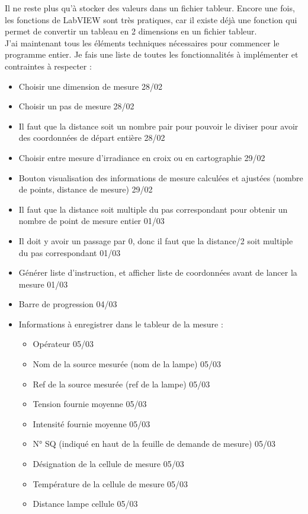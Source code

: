 \documentclass[12pt]{article}
\begin{document}
Il ne reste plus qu'à stocker des valeurs dans un fichier tableur.
Encore une fois, les fonctions de LabVIEW sont très pratiques, car il existe déjà une fonction qui permet de convertir un tableau en 2 dimensions en un fichier tableur.\\
J'ai maintenant tous les éléments techniques nécessaires pour commencer le programme entier.
Je fais une liste de toutes les fonctionnalités à implémenter et contraintes à respecter :
\begin{itemize}
	\item  Choisir une dimension de mesure  28/02
	\item  Choisir un pas de mesure  28/02
	\item  Il faut que la distance soit un nombre pair pour pouvoir le diviser pour avoir des coordonnées de départ entière  28/02
	\item  Choisir entre mesure d'irradiance en croix ou en cartographie 29/02
	\item  Bouton visualisation des informations de mesure calculées et ajustées (nombre de points, distance de mesure)  29/02
	\item  Il faut que la distance soit multiple du pas correspondant pour obtenir un nombre de point de mesure entier  01/03
	\item  Il doit y avoir un passage par 0, donc il faut que la distance/2 soit multiple du pas correspondant  01/03
	\item  Générer liste d'instruction, et afficher liste de coordonnées avant de lancer la mesure  01/03
	\item  Barre de progression  04/03
	\item  Informations à enregistrer dans le tableur de la mesure :
		\begin{itemize}
	\item  Opérateur  05/03
	\item  Nom de la source mesurée (nom de la lampe)  05/03
	\item  Ref de la source mesurée (ref de la lampe)  05/03
	\item  Tension fournie moyenne  05/03
	\item  Intensité fournie moyenne  05/03
	\item  N° SQ (indiqué en haut de la feuille de demande de mesure)  05/03
	\item  Désignation de la cellule de mesure  05/03
	\item  Température de la cellule de mesure  05/03
	\item  Distance lampe cellule  05/03

\end{itemize}
\end{itemize}
\end{document}

